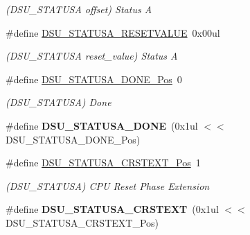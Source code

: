 \begin{DoxyCompactItemize}
\begin{DoxyCompactList}\small\item\em (D\+S\+U\+\_\+\+S\+T\+A\+T\+U\+S\+A offset) Status A \end{DoxyCompactList}\item 
\hypertarget{group___s_a_m_l21___d_s_u_ga39ce3f6cadacf2ea11a0e8ab5d6bcd4b}{}\#define \hyperlink{group___s_a_m_l21___d_s_u_ga39ce3f6cadacf2ea11a0e8ab5d6bcd4b}{D\+S\+U\+\_\+\+S\+T\+A\+T\+U\+S\+A\+\_\+\+R\+E\+S\+E\+T\+V\+A\+L\+U\+E}~0x00ul\label{group___s_a_m_l21___d_s_u_ga39ce3f6cadacf2ea11a0e8ab5d6bcd4b}

\begin{DoxyCompactList}\small\item\em (D\+S\+U\+\_\+\+S\+T\+A\+T\+U\+S\+A reset\+\_\+value) Status A \end{DoxyCompactList}\item 
\hypertarget{group___s_a_m_l21___d_s_u_ga608007c6aa3ae0221483e370d9ca999b}{}\#define \hyperlink{group___s_a_m_l21___d_s_u_ga608007c6aa3ae0221483e370d9ca999b}{D\+S\+U\+\_\+\+S\+T\+A\+T\+U\+S\+A\+\_\+\+D\+O\+N\+E\+\_\+\+Pos}~0\label{group___s_a_m_l21___d_s_u_ga608007c6aa3ae0221483e370d9ca999b}

\begin{DoxyCompactList}\small\item\em (D\+S\+U\+\_\+\+S\+T\+A\+T\+U\+S\+A) Done \end{DoxyCompactList}\item 
\hypertarget{group___s_a_m_l21___d_s_u_ga824b2ff5600830ebc7971da3eeea0b7b}{}\#define {\bfseries D\+S\+U\+\_\+\+S\+T\+A\+T\+U\+S\+A\+\_\+\+D\+O\+N\+E}~(0x1ul $<$$<$ D\+S\+U\+\_\+\+S\+T\+A\+T\+U\+S\+A\+\_\+\+D\+O\+N\+E\+\_\+\+Pos)\label{group___s_a_m_l21___d_s_u_ga824b2ff5600830ebc7971da3eeea0b7b}

\item 
\hypertarget{group___s_a_m_l21___d_s_u_gab5c6d644e1ec7f67cf2a9ad97a5262a2}{}\#define \hyperlink{group___s_a_m_l21___d_s_u_gab5c6d644e1ec7f67cf2a9ad97a5262a2}{D\+S\+U\+\_\+\+S\+T\+A\+T\+U\+S\+A\+\_\+\+C\+R\+S\+T\+E\+X\+T\+\_\+\+Pos}~1\label{group___s_a_m_l21___d_s_u_gab5c6d644e1ec7f67cf2a9ad97a5262a2}

\begin{DoxyCompactList}\small\item\em (D\+S\+U\+\_\+\+S\+T\+A\+T\+U\+S\+A) C\+P\+U Reset Phase Extension \end{DoxyCompactList}\item 
\hypertarget{group___s_a_m_l21___d_s_u_ga4ce5d24ab18ad2bf2cc5925d30432907}{}\#define {\bfseries D\+S\+U\+\_\+\+S\+T\+A\+T\+U\+S\+A\+\_\+\+C\+R\+S\+T\+E\+X\+T}~(0x1ul $<$$<$ D\+S\+U\+\_\+\+S\+T\+A\+T\+U\+S\+A\+\_\+\+C\+R\+S\+T\+E\+X\+T\+\_\+\+Pos)\label{group___s_a_m_l21___d_s_u_ga4ce5d24ab18ad2bf2cc5925d30432907}


\end{DoxyCompactItemize}
